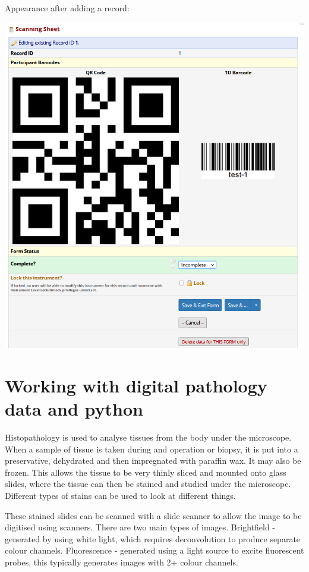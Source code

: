\documentclass[
]{book}
\begin{document}
Appearance after adding a record:

\includegraphics[width=10.29in]{img/barcode_appearance}

\hypertarget{working-with-digital-pathology-data-and-python}{%
\chapter{Working with digital pathology data and python}\label{working-with-digital-pathology-data-and-python}}

Histopathology is used to analyse tissues from the body under the microscope. When a sample of tissue is taken during and operation or biopsy, it is put into a preservative, dehydrated and then impregnated with paraffin wax. It may also be frozen. This allows the tissue to be very thinly sliced and mounted onto glass slides, where the tissue can then be stained and studied under the microscope. Different types of stains can be used to look at different things.

These stained slides can be scanned with a slide scanner to allow the image to be digitised using scanners. There are two main types of images. Brightfield - generated by using white light, which requires deconvolution to produce separate colour channels. Fluorescence - generated using a light source to excite fluorescent probes, this typically generates images with 2+ colour channels.
\end{document}

